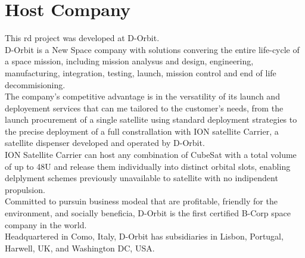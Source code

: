 \section{Host Company}
This \acrshort{rd} project was developed at D-Orbit.\\
D-Orbit is a New Space company with solutions convering the entire life-cycle of a space mission, including mission analysus and design, engineering, manufacturing, integration, testing, launch, mission control and end of life decommisioning.\\
The company's competitive advantage is in the versatility of its launch and deployement services that can me tailored to the customer's needs, from the launch procurement of a single satellite using standard deployment strategies to the precise deployment of a full constrallation with ION satellite Carrier, a satellite dispenser developed and operated by D-Orbit.\\
ION Satellite Carrier can host any combination of CubeSat with a total volume of up to 48U and release them individually into distinct orbital slots, enabling delplyment schemes previously unavailable to satellite with no indipendent propulsion.\\
Committed to pursuin business modeal that are profitable, friendly for the environment, and socially beneficia, D-Orbit is the first certified B-Corp space company in the world.\\
Headquartered in Como, Italy, D-Orbit has subsidiaries in Lisbon, Portugal, Harwell, UK, and Washington DC, USA.\\
